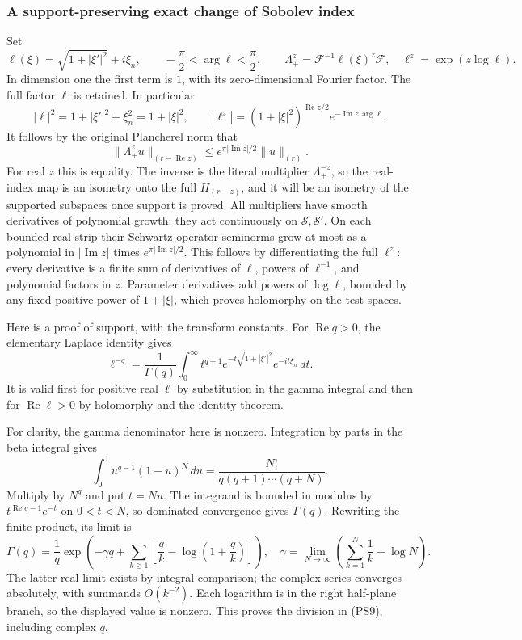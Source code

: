 \documentclass[
  11pt,
]{article}
\begin{document}
\subsubsection{A support-preserving exact change of Sobolev
index}\label{a-support-preserving-exact-change-of-sobolev-index}

Set \[
 \ell(\xi)=\sqrt{1+|\xi'|^2}+i\xi_n,\qquad
 -\frac{\pi}{2}<\arg\ell<\frac{\pi}{2},\qquad
 \Lambda_+^z=\mathcal F^{-1}\ell(\xi)^z\mathcal F,
 \quad \ell^z=\exp(z\log\ell).
 \tag{PS6}
\] In dimension one the first term is \(1\), with its zero-dimensional
Fourier factor. The full factor \(\ell\) is retained. In particular \[
 |\ell|^2=1+|\xi'|^2+\xi_n^2=1+|\xi|^2,\qquad
 |\ell^z|=(1+|\xi|^2)^{\operatorname{Re}z/2}
           e^{-\operatorname{Im}z\,\arg\ell}.
 \tag{PS7}
\] It follows by the original Plancherel norm that \[
 \|\Lambda_+^z u\|_{(r-\operatorname{Re}z)}
 \le e^{\pi|\operatorname{Im}z|/2}\|u\|_{(r)}.
 \tag{PS8}
\] For real \(z\) this is equality. The inverse is the literal
multiplier \(\Lambda_+^{-z}\), so the real-index map is an isometry onto
the full \(H_{(r-z)}\), and it will be an isometry of the supported
subspaces once support is proved. All multipliers have smooth
derivatives of polynomial growth; they act continuously on
\(\mathcal S,\mathcal S'\). On each bounded real strip their Schwartz
operator seminorms grow at most as a polynomial in
\(|\operatorname{Im}z|\) times \(e^{\pi|\operatorname{Im}z|/2}\). This
follows by differentiating the full \(\ell^z\): every derivative is a
finite sum of derivatives of \(\ell\), powers of \(\ell^{-1}\), and
polynomial factors in \(z\). Parameter derivatives add powers of
\(\log\ell\), bounded by any fixed positive power of \(1+|\xi|\), which
proves holomorphy on the test spaces.

Here is a proof of support, with the transform constants. For
\(\operatorname{Re}q>0\), the elementary Laplace identity gives \[
 \ell^{-q}=\frac1{\Gamma(q)}
       \int_0^\infty t^{q-1}
          e^{-t\sqrt{1+|\xi'|^2}}e^{-it\xi_n}\,dt .
 \tag{PS9}
\] It is valid first for positive real \(\ell\) by substitution in the
gamma integral and then for \(\operatorname{Re}\ell>0\) by holomorphy
and the identity theorem.

For clarity, the gamma denominator here is nonzero. Integration by parts
in the beta integral gives \[
 \int_0^1 u^{q-1}(1-u)^N\,du
 =\frac{N!}{q(q+1)\cdots(q+N)}.
\] Multiply by \(N^q\) and put \(t=Nu\). The integrand is bounded in
modulus by \(t^{\operatorname{Re}q-1}e^{-t}\) on \(0<t<N\), so dominated
convergence gives \(\Gamma(q)\). Rewriting the finite product, its limit
is \[
 \Gamma(q)=\frac1q\exp\!\left(
   -\gamma q+\sum_{k\ge1}
        \left[\frac qk-\log\left(1+\frac qk\right)\right]\right),
 \quad
 \gamma=\lim_{N\to\infty}\left(\sum_{k=1}^N\frac1k-\log N\right).
\] The latter real limit exists by integral comparison; the complex
series converges absolutely, with summands \(O(k^{-2})\). Each logarithm
is in the right half-plane branch, so the displayed value is nonzero.
This proves the division in (PS9), including complex \(q\).
\end{document}
